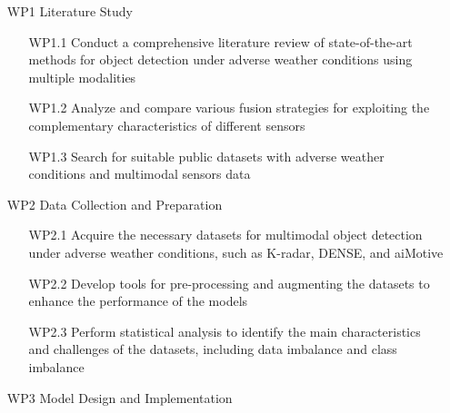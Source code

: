 \documentclass[thesis]{mas_proposal}
\begin{document}
\begin{enumerate}

      \item[WP1] Literature Study
            \begin{itemize}

                  \item[WP1.1] Conduct a comprehensive literature review of state-of-the-art methods for object detection under adverse weather conditions using multiple modalities
                  \item[WP1.2] Analyze and compare various fusion strategies for exploiting the complementary characteristics of different sensors
                  \item[WP1.3] Search for suitable public datasets with adverse weather conditions and multimodal sensors data

            \end{itemize}


      \item[WP2] Data Collection and Preparation
            \begin{itemize}

                  \item[WP2.1] Acquire the necessary datasets for multimodal object detection under adverse weather conditions, such as K-radar, DENSE, and aiMotive
                  \item[WP2.2] Develop tools for pre-processing and augmenting the datasets to enhance the performance of the models
                  \item[WP2.3] Perform statistical analysis to identify the main characteristics and challenges of the datasets, including data imbalance and class imbalance

            \end{itemize}

      \item[WP3] Model Design and Implementation
            \begin{itemize}


\end{itemize}
\end{enumerate}
\end{document}
